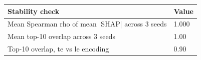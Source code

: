 \begin{tabular}{ll}
\toprule
Stability check & Value \\
\midrule
Mean Spearman rho of mean |SHAP| across 3 seeds & 1.000 \\
Mean top-10 overlap across 3 seeds & 1.00 \\
Top-10 overlap, te vs le encoding & 0.90 \\
\bottomrule
\end{tabular}
